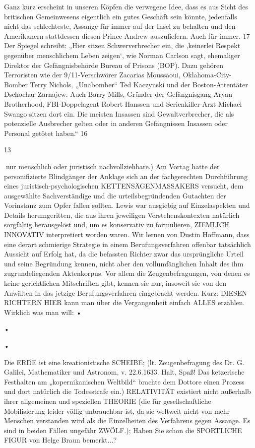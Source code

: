 \begin{multicols}{2}
Ganz kurz erscheint in unseren Köpfen die verwegene Idee, dass es aus Sicht des britischen Gemeinwesens
eigentlich ein gutes Geschäft sein könnte, jedenfalls nicht das schlechteste, Assange für immer auf der Insel zu
behalten und den Amerikanern stattdessen diesen Prince Andrew auszuliefern. Auch für immer.
17
Der Spiegel schreibt: „Hier sitzen Schwerverbrecher ein, die ‚keinerlei Respekt gegenüber menschlichem
Leben zeigen‘, wie Norman Carlson sagt, ehemaliger Direktor der Gefängnisbehörde Bureau of Prisons (BOP).
Dazu gehören Terroristen wie der 9/11-Verschwörer Zacarias Moussaoui, Oklahoma-City-Bomber Terry Nichols, „Unabomber“ Ted Kaczynski und der Boston-Attentäter Dschochar Zarnajew. Auch Barry Mills, Gründer
der Gefängnisgang Aryan Brotherhood, FBI-Doppelagent Robert Hanssen und Serienkiller-Arzt Michael Swango sitzen dort ein. Die meisten Insassen sind Gewaltverbrecher, die als potenzielle Ausbrecher gelten oder in
anderen Gefängnissen Insassen oder Personal getötet haben.“
16

13

nur menschlich oder juristisch nachvollziehbare.)
Am Vortag hatte der personifizierte Blindgänger der Anklage sich an der fachgerechten Durchführung eines juristisch-psychologischen KETTENSÄGENMASSAKERS
versucht, dem ausgewählte Sachverständige und die
urteilsbegründenden Gutachten der Vorinstanz zum
Opfer fallen sollten. Lewis war ausgiebig auf Einzelaspekten und Details herumgeritten, die aus ihren jeweiligen Verstehenskontexten natürlich sorgfältig herausgelöst und, um es konservativ zu formulieren, ZIEMLICH
INNOVATIV interpretiert worden waren. Wir lernen von
Dustin Hoffmann, dass eine derart schmierige Strategie
in einem Berufungsverfahren offenbar tatsächlich Aussicht auf Erfolg hat, da die befassten Richter zwar das ursprüngliche Urteil und seine Begründung kennen, nicht
aber den vollumfänglichen Inhalt des ihm zugrundeliegenden Aktenkorpus. Vor allem die Zeugenbefragungen,
von denen es keine gerichtlichen Mitschriften gibt, kennen sie nur, insoweit sie von den Anwälten in das jetzige
Berufungsverfahren eingebracht werden.
Kurz: DIESEN RICHTERN HIER kann man über die Vergangenheit einfach ALLES erzählen. Wirklich was man
will:
•

•

•

Die ERDE ist eine kreationistische SCHEIBE; (lt. Zeugenbefragung des Dr. G. Galilei, Mathematiker und
Astronom, v. 22.6.1633. Halt, Spaß! Das ketzerische
Festhalten am „kopernikanischen Weltbild“ brachte
dem Dottore einen Prozess und dort natürlich die
Todesstrafe ein.)
RELATIVITÄT existiert nicht außerhalb ihrer allgemeinen und speziellen THEORIE (die für gesellschaftliche Mobilisierung leider völlig unbrauchbar ist, da sie weltweit nicht von mehr Menschen
verstanden wird als die Einzelheiten des Verfahrens
gegen Assange. Es sind in beiden Fällen ungefähr
ZWÖLF.);
Haben Sie schon die SPORTLICHE FIGUR von Helge
Braun bemerkt...?


\end{multicols}
